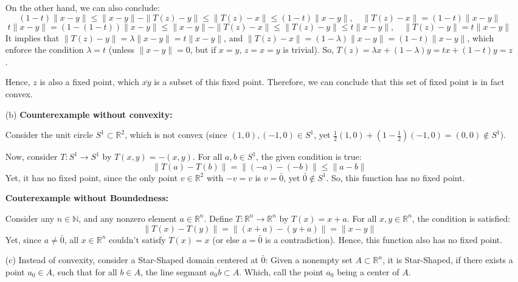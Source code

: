\documentclass{article}
\begin{document}
\begin{itemize}
    On the other hand, we can also conclude:
    $$(1-t)\|x-y\| \leq \|x-y\|-\|T(z)-y\| \leq \|T(z)-x\| \leq (1-t)\|x-y\|,\quad \|T(z)-x\| = (1-t)\|x-y\|$$
    $$t\|x-y\| = (1-(1-t))\|x-y\| \leq \|x-y\|-\|T(z)-x\| \leq \|T(z)-y\| \leq t\|x-y\|,\quad \|T(z)-y\|=t\|x-y\|$$
    It implies that $\|T(z)-y\|=\lambda\|x-y\|=t\|x-y\|$, and $\|T(z)-x\|=(1-\lambda)\|x-y\|=(1-t)\|x-y\|$, which enforce the condition $\lambda =t$ (unless $\|x-y\|=0$, but if $x=y$, $z=x=y$ is trivial).
    So, $T(z)=\lambda x+(1-\lambda)y = tx+(1-t)y=z$.

    Hence, $z$ is also a fixed point, which $\overline{xy}$ is a subset of this fixed point. Therefore, we can conclude that this set of fixed point is in fact convex.

    
    \hfil

    \item[(b)] \textbf{Counterexample without convexity:}
    
    Consider the unit circle $S^1 \subset \mathbb{R}^2$, which is not convex (since $(1,0), (-1,0)\in S^1$, yet $\frac{1}{2}(1,0)+(1-\frac{1}{2})(-1,0)=(0,0)\notin S^1$).

    Now, consider $T:S^1\rightarrow S^1$ by $T(x,y)=-(x,y)$. For all $a,b\in S^1$, the given condition is true:
    $$\|T(a)-T(b)\| = \|(-a)-(-b)\| \leq \|a-b\|$$
    Yet, it has no fixed point, since the only point $v\in \mathbb{R}^2$ with $-v = v$ is $v=\bar{0}$, yet $\bar{0}\notin S^1$.
    So, this function has no fixed point.

    \hfil

    \textbf{Couterexample without Boundedness:}

    Consider any $n\in\mathbb{N}$, and any nonzero element $a\in\mathbb{R}^n$. Define $T:\mathbb{R}^n\rightarrow\mathbb{R}^n$ by $T(x)=x+a$.
    For all $x,y\in \mathbb{R}^n$, the condition is satisfied:
    $$\|T(x)-T(y)\| = \|(x+a)-(y+a)\| = \|x-y\|$$
    Yet, since $a\neq \bar{0}$, all $x\in\mathbb{R}^n$ couldn't satisfy $T(x)=x$ (or else $a=\bar{0}$ is a contradiction). Hence, this function also has no fixed point.

    \hfil

    \item[(c)] Instead of convexity, consider a Star-Shaped domain centered at $\bar{0}$: Given a nonempty set $A\subset \mathbb{R}^n$, it is Star-Shaped,
    if there exists a point $a_0\in A$, such that for all $b\in A$, the line segmant $\overline{a_0b}\subset A$. Which, call the point $a_0$ being a center of $A$.


\end{itemize}
\end{document}
